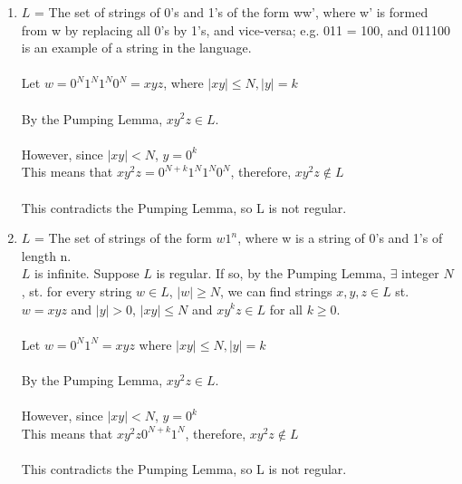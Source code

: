 \documentclass[a4paper]{article}
\begin{document}
\begin{enumerate}
\item $L$ = The set of strings of 0's and 1's of the form ww', where w' is formed from w by replacing all 0's by 1's, and vice-versa; e.g. 011 = 100, and 011100 is an example of a string in the language. \\
\\
Let $w = 0^N1^N1^N0^N = xyz$, where $|xy| \le N, |y| = k$ \\
\\
By the Pumping Lemma, $xy^2 z \in L$. \\
\\
However, since $|xy| < N$, $y = 0^k$ \\
This means that $xy^2z = 0^{N+k}1^N1^N0^N$, therefore, $xy^2z \notin L$\\
\\
This contradicts the Pumping Lemma, so L is not regular. 
\\

\item $L$ = The set of strings of the form $w1^n$, where w is a string of 0's and 1's of length n. \\
$L$ is infinite. Suppose $L$ is regular. If so, by the Pumping Lemma, $\exists$ integer $N$, st. for every string $w \in L$, $|w| \ge N$, we can find strings $x, y, z \in L$ st. $w=xyz$ and $|y|>0$, $|xy| \le N$ and $xy^k z \in L$ for all $k \ge 0$. 
\\ \\
Let $w = 0^N1^N = xyz$ where $|xy| \le N, |y| = k$ \\
\\
By the Pumping Lemma, $xy^2 z \in L$. \\
\\
However, since $|xy| < N$, $y = 0^k$ \\
This means that $xy^2 z 0^{N+k}1^N$, therefore, $xy^2z \notin L$\\
\\
This contradicts the Pumping Lemma, so L is not regular.


\end{enumerate}
\end{document}
